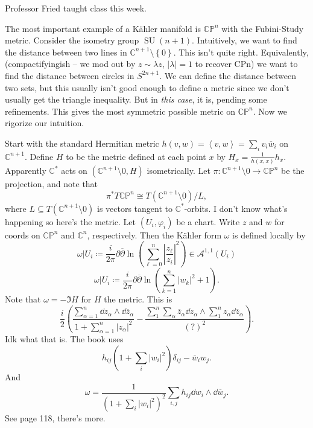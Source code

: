 
Professor Fried taught class this week.

The most important example of a K\"ahler manifold is $\mathbb{C} \mathbb{P} ^n$ with the Fubini-Study metric. Consider the isometry group $\operatorname{SU} (n+1)$. Intuitively, we want to find the distance between two lines in $\mathbb{C} ^{n+1} \setminus \left\{ 0 \right\} $. This isn't quite right. Equivalently, (compactifyingish -- we mod out by $z \sim \lambda z$, $\left| \lambda  \right| =1$ to recover CPn) we want to find the distance between circles in $S^{2n+1} $. We can define the distance between two sets, but this usually isn't good enough to define a metric since we don't usually get the triangle inequality. But in \emph{this case}, it is, pending some refinements. This gives the most symmetric possible metric on $\mathbb{C} \mathbb{P} ^n$. Now we rigorize our intuition.

Start with the standard Hermitian metric $h(v,w)=\left\langle v,w \right\rangle =\sum_{i} v_i \overline{w} _i$ on $\mathbb{C} ^{n+1} $. Define $H$ to be the metric defined at each point $x$ by $H_x = \frac{1}{h(x,x)} h_x$. Apparently $\mathbb{C} ^*$ acts on $(\mathbb{C} ^{n+1} \setminus 0,H)$ isometrically. Let $\pi : \mathbb{C} ^{n+1} \setminus 0 \to \mathbb{C} \mathbb{P} ^n$ be the projection, and note that
\[
	\pi ^* T\mathbb{C} \mathbb{P} ^n \cong T(\mathbb{C} ^{n+1} \setminus 0) / L,
\]
where $L\subseteq T(\mathbb{C} ^{n+1}\setminus 0) $ is vectors tangent to $\mathbb{C} ^*$-orbits. I don't know what's happening so here's the metric. Let $(U_i,\varphi _i)$ be a chart. Write $z$ and $w$ for coords on $\mathbb{C} \mathbb{P}^n$ and $\mathbb{C} ^{n} $, respectively. Then the K\"ahler form $\omega $ is defined locally by
\[
	\omega|U_i \coloneqq \frac{i}{2\pi } \partial \overline{\partial } \ln \left( \sum_{\ell =0}^{n} \left| \frac{z_\ell }{z_i}  \right| ^2 \right) \in \mathcal{A} ^{1,1} (U_i)
\]
\[
	\omega |U_i \coloneqq \frac{i}{2\pi } \partial \overline{\partial } \ln \left( \sum_{k=1}^{n} \left| w_k \right| ^2 +1\right) 
.\]
Note that $\omega =- \Im H$ for $H$ the metric. This is
\[
	\frac{i}{2} \left( \frac{\sum_{\alpha =1}^{n} \dd z_\alpha \wedge \dd \overline{z} _\alpha }{1+\sum_{\alpha =1}^{n} \left| z_\alpha  \right| ^2} -\frac{\sum_{1}^{n} \sum_{\alpha } \overline{z} _\alpha \dd z_\alpha \wedge \sum_{1}^{n} z_\alpha \dd \overline{z} _\alpha }{\left( ? \right) ^2}  \right) 
.\]
Idk what that is. The book uses
\[
	h_{ij} \left(1+\sum_{i} \left| w_i \right| ^2\right)\delta _{ij} -\overline{w} _iw_j
.\]
And
\[
	\omega =\frac{1}{\left( 1+\sum_i \left| w_i \right| ^2 \right) ^2} \sum_{i,j} h_{ij} \dd w_i \wedge \dd \overline{w} _j
.\]
See page 118, there's more.



